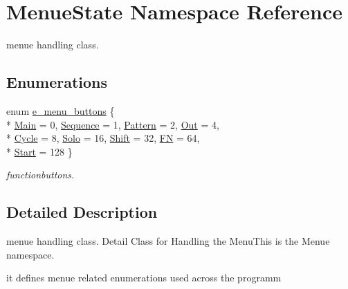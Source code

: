 \hypertarget{namespaceMenueState}{\section{Menue\-State Namespace Reference}
\label{namespaceMenueState}
}


menue handling class.  


\subsection*{Enumerations}
\begin{DoxyCompactItemize}
\item 
enum \hyperlink{namespaceMenueState_a77fb3d41627d31d4687141a0b378ba8f}{e\-\_\-menu\-\_\-buttons} \{ \\*
\hyperlink{namespaceMenueState_a77fb3d41627d31d4687141a0b378ba8faaaee8a13bacc2b7dfae01ae79f090f4a}{Main} = 0, 
\hyperlink{namespaceMenueState_a77fb3d41627d31d4687141a0b378ba8fab8706a1dfa8ba10def421a1cf910b013}{Sequence} = 1, 
\hyperlink{namespaceMenueState_a77fb3d41627d31d4687141a0b378ba8fa7cb0533617567bb0954ca076b01b0b5e}{Pattern} = 2, 
\hyperlink{namespaceMenueState_a77fb3d41627d31d4687141a0b378ba8fa05657f4acb3ecf3366b3132d2933b14b}{Out} = 4, 
\\*
\hyperlink{namespaceMenueState_a77fb3d41627d31d4687141a0b378ba8fa9a038224f0368e0deee034436e0b3d0c}{Cycle} = 8, 
\hyperlink{namespaceMenueState_a77fb3d41627d31d4687141a0b378ba8fa89a02fb1208748caa381a1024d907049}{Solo} = 16, 
\hyperlink{namespaceMenueState_a77fb3d41627d31d4687141a0b378ba8fa7df45e6ab077b489909d2a2b0bbb47bb}{Shift} = 32, 
\hyperlink{namespaceMenueState_a77fb3d41627d31d4687141a0b378ba8fa5981c7e1a6ce9918044ea6905f3c354e}{F\-N} = 64, 
\\*
\hyperlink{namespaceMenueState_a77fb3d41627d31d4687141a0b378ba8fa97bfe9aaf172560b3b180095dcd3ca81}{Start} = 128
 \}
\begin{DoxyCompactList}\small\item\em functionbuttons. \end{DoxyCompactList}\end{DoxyCompactItemize}


\subsection{Detailed Description}
menue handling class. Detail Class for Handling the Menu\-This is the Menue namespace.\par
 it defines menue related enumerations used across the programm 

